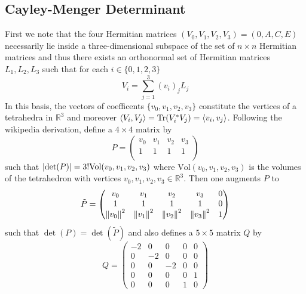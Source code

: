 \documentclass[notitlepage, 10pt]{article}
\begin{document}
\subsection{Cayley-Menger Determinant}

First we note that the four Hermitian matrices $(V_0,V_1,V_2,V_3) = (0,A,C,E)$ necessarily lie inside a three-dimensional subspace of the set of $n\times n$ Hermitian matrices and thus there exists an orthonormal set of Hermitian matrices $L_1, L_2, L_3$ such that for each $i \in \{0,1,2,3\}$
\begin{equation}
    V_i = \sum_{j=1}^{3} (v_i)_j L_j
\end{equation}
In this basis, the vectors of coefficents $\{v_0, v_1, v_2, v_3\}$ constitute the vertices of a tetrahedra in $\mathbb R^3$ and moreover $\braket{V_i, V_j} = \operatorname{Tr}(V_i^* V_j) = \braket{v_i, v_j}$.
Following the wikipedia derivation, define a $4 \times 4$ matrix by
\begin{equation}
    P = \begin{pmatrix}
        v_0 & v_1 & v_2 & v_3  \\
        1 & 1 & 1 & 1  \\
    \end{pmatrix}
\end{equation}
such that $\left|\det(P)\right| = 3! \mathrm{Vol}(v_0,v_1,v_2,v_3)$ where $\mathrm{Vol}(v_0,v_1,v_2,v_3)$ is the volumes of the tetrahedron with vertices $v_0,v_1,v_2,v_3 \in \mathbb R^3$.
Then one augments $P$ to
\begin{equation}
    \tilde P = \begin{pmatrix}
        v_0 & v_1 & v_2 & v_3 & 0  \\
        1 & 1 & 1 & 1 & 0  \\
        \left\lVert v_0\right\rVert^{2} & \left\lVert v_1\right\rVert^{2} & \left\lVert v_2\right\rVert^{2} & \left\lVert v_3\right\rVert^2 & 1 \\
    \end{pmatrix}
\end{equation}
such that $\det(P) = \det(\tilde P)$ and also defines a $5 \times 5$ matrix $Q$ by 
\begin{equation}
    Q = \begin{pmatrix}
        -2 & 0 & 0 & 0 & 0 \\ 
        0 & -2 & 0 & 0 & 0 \\ 
        0 & 0 & -2 & 0 & 0 \\ 
        0 & 0 & 0 & 0 & 1 \\ 
        0 & 0 & 0 & 1 & 0 
    \end{pmatrix}
\end{equation}
\end{document}
